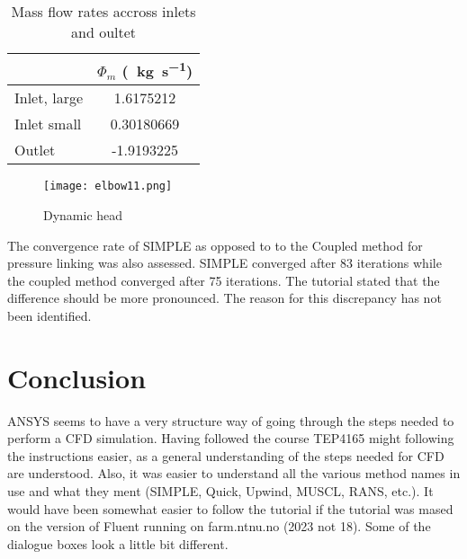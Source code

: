 \documentclass{article}
\begin{document}
\begin{table}[h]
\centering
\caption{Mass flow rates accross inlets and oultet}
\begin{tabular}{lc}
\toprule
	& $\Phi_m$ (\SI{}{\kilo\gram\per\second}) \\
\midrule
Inlet, large & 1.6175212 \\
Inlet small & 0.30180669 \\
Outlet & -1.9193225 \\
\bottomrule
\end{tabular}
\end{table}

\begin{figure}
\texttt{[image: elbow11.png]}
\caption{Dynamic head}
\label{fig:11}
\end{figure}

The convergence rate of SIMPLE as opposed to to the Coupled method for pressure linking was also assessed. SIMPLE converged after 83 iterations while the coupled method converged after 75 iterations. The tutorial stated that the difference should be more pronounced. The reason for this discrepancy has not been identified.

\section{Conclusion}
 ANSYS seems to have a very structure way of going through the steps needed to perform a CFD simulation. Having followed the course TEP4165 might following the instructions easier, as a general understanding of the steps needed for CFD are understood. Also, it was easier to understand all the various method names in use and what they ment (SIMPLE, Quick, Upwind, MUSCL, RANS, etc.). It would have been somewhat easier to follow the tutorial if the tutorial was mased on the version of Fluent running on farm.ntnu.no (2023 not 18). Some of the dialogue boxes look a little bit different.

\end{document}
